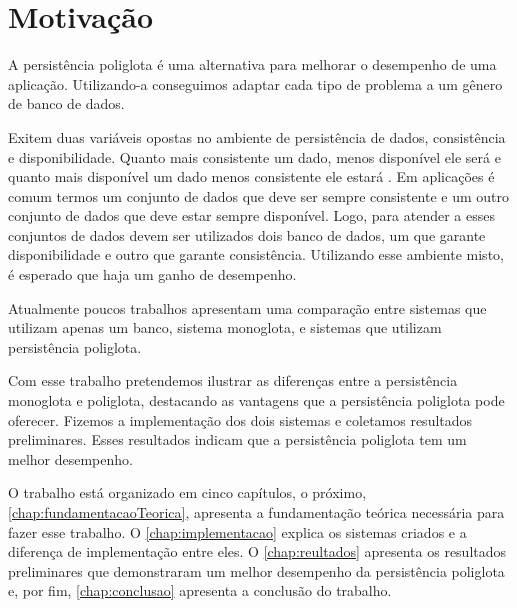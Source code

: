 \section{Motivação}
\label{sec:motivacao}
A persistência poliglota é uma alternativa para melhorar o desempenho de uma aplicação. Utilizando-a conseguimos adaptar cada tipo de problema a um gênero de banco de dados.

Exitem duas variáveis opostas no ambiente de persistência de dados, consistência e disponibilidade. Quanto mais consistente um dado, menos disponível ele será e quanto mais disponível um dado menos consistente ele estará \cite{NoSQL}. Em aplicações é comum termos um conjunto de dados que deve ser sempre consistente e um outro conjunto de dados que deve estar sempre disponível. Logo, para atender a esses conjuntos de dados devem ser utilizados dois banco de dados, um que garante disponibilidade e outro que garante  consistência. Utilizando esse ambiente misto, é esperado que haja um ganho de desempenho.

Atualmente poucos trabalhos apresentam uma comparação entre sistemas que utilizam apenas um banco, sistema monoglota,  e sistemas que utilizam persistência poliglota.

Com esse trabalho pretendemos ilustrar as diferenças entre a persistência monoglota e poliglota, destacando as vantagens que a persistência poliglota pode oferecer. Fizemos a implementação dos dois sistemas e coletamos resultados preliminares. Esses resultados indicam que a persistência poliglota tem um melhor desempenho.

O trabalho está organizado em cinco capítulos, o próximo, \autoref{chap:fundamentacaoTeorica}, apresenta a fundamentação teórica necessária para fazer esse trabalho. O \autoref{chap:implementacao} explica os sistemas criados e a diferença de implementação entre eles. O \autoref{chap:reultados} apresenta os resultados preliminares que demonstraram um melhor desempenho da persistência poliglota e, por fim, \autoref{chap:conclusao} apresenta a conclusão do trabalho.

